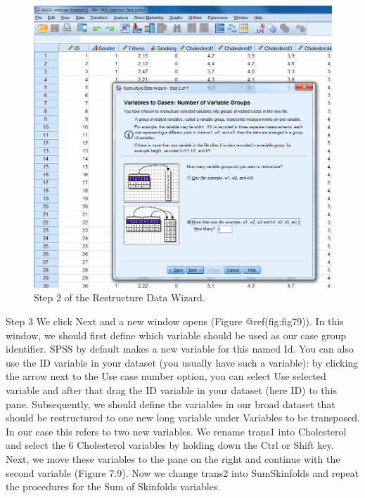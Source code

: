 \documentclass[
]{book}
\begin{document}
\begin{figure}

{\centering \includegraphics[width=0.9\linewidth]{images/fig7.8} 

}

\caption{Step 2 of the Restructure Data Wizard.}\label{fig:fig78}
\end{figure}

Step 3 We click Next and a new window opens (Figure @ref(fig:fig79)). In
this window, we should first define which variable should be used as our
case group identifier. SPSS by default makes a new variable for this
named Id. You can also use the ID variable in your dataset (you usually
have such a variable): by clicking the arrow next to the Use case number
option, you can select Use selected variable and after that drag the ID
variable in your dataset (here ID) to this pane. Subsequently, we should
define the variables in our broad dataset that should be restructured to
one new long variable under Variables to be transposed. In our case this
refers to two new variables. We rename trans1 into Cholesterol and
select the 6 Cholesterol variables by holding down the Ctrl or Shift
key. Next, we move these variables to the pane on the right and continue
with the second variable (Figure 7.9). Now we change trans2 into
SumSkinfolds and repeat the procedures for the Sum of Skinfolds
variables.
\end{document}
